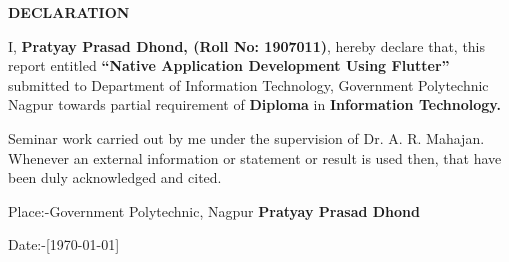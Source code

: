 \begin{center}
{\Large{\bf{DECLARATION}}}
\end{center}

\noindent

I, \textbf{Pratyay Prasad Dhond, (Roll No: 1907011)}, hereby declare that, this report entitled \textbf{``Native Application Development Using Flutter”} submitted to Department of Information Technology, Government Polytechnic Nagpur towards
partial requirement of \textbf{ Diploma} in \textbf{Information Technology.} 
\par Seminar work carried out by me under the supervision of Dr. A. R. Mahajan. Whenever an external information or statement or result is used then, that have been duly acknowledged and cited.

\vspace{4cm}

\noindent Place:-Government Polytechnic, Nagpur \hfill \textbf{Pratyay Prasad Dhond}

\noindent Date:-[\today]

\clearpage
